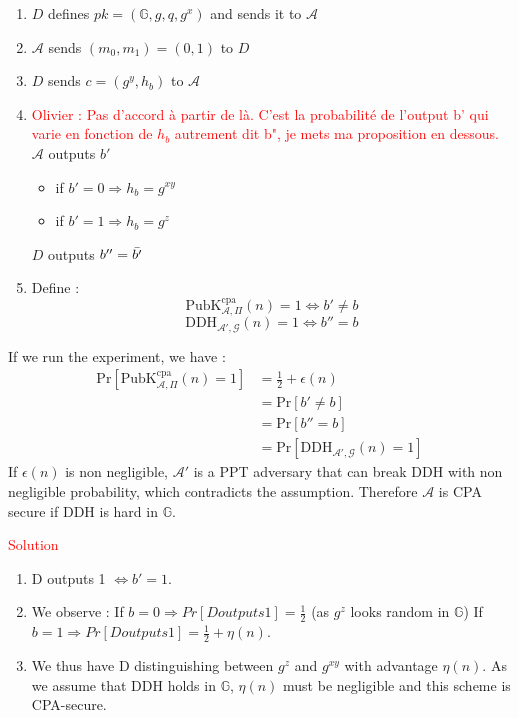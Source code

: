 \begin{solution}
\begin{enumerate}
\begin{enumerate}
        \item $D$ defines $pk = (\mathbb{G},g,q,g^x)$ and sends it to $\mathcal{A}$
        \item $\mathcal{A}$ sends $(m_0,m_1) = (0,1)$ to $D$
        \item $D$ sends $c=(g^y,h_b)$ to $\mathcal{A}$
        \item \textcolor{red}{Olivier : Pas d'accord à partir de là. C'est la probabilité de l'output b' qui varie en fonction de $h_b$ autrement dit b", je mets ma proposition en dessous.} $\mathcal{A}$ outputs $b'$ 
            \begin{itemize}
                \item if $b'=0\Rightarrow h_b=g^{xy}$
                \item if $b'=1\Rightarrow h_b=g^z$
            \end{itemize}
            $D$ outputs $b''=\Bar{b'}$
        \item Define : $$\text{PubK}^\text{cpa}_{\mathcal{A},\Pi}(n) = 1 \Leftrightarrow b'\neq b$$ $$\text{DDH}_{\mathcal{A}',\mathcal{G}}(n) = 1 \Leftrightarrow b''=b$$
    \end{enumerate}
    If we run the experiment, we have :
    \begin{align*}
        \text{Pr}[\text{PubK}^\text{cpa}_{\mathcal{A},\Pi}(n) = 1] &= \frac{1}{2}+\epsilon(n)\\
        &= \text{Pr}[b'\neq b]\\
        &= \text{Pr}[b''=b]\\
        &= \text{Pr}[\text{DDH}_{\mathcal{A}',\mathcal{G}}(n) = 1]
    \end{align*}
    If $\epsilon(n)$ is non negligible, $\mathcal{A}'$ is a PPT adversary that can break DDH with non negligible probability, which contradicts the assumption. Therefore $\mathcal{A}$ is CPA secure if DDH is hard in $\mathbb{G}$.
\end{enumerate}

\textcolor{red}{Solution} 

\begin{enumerate}
    \item D outputs 1 $\Leftrightarrow b'=1$.
    \item We observe : \newline
    If $b=0 \Rightarrow Pr[D outputs 1]=\frac{1}{2}$ (as $g^z$ looks random in $\mathbb{G}$) \newline
    If $b=1 \Rightarrow Pr[D outputs 1]=\frac{1}{2}+\eta(n)$.
    \item We thus have D distinguishing between $g^z$ and $g^{xy}$ with advantage $\eta(n)$. As we assume that DDH holds in $\mathbb{G}$, $\eta(n)$ must be negligible and this scheme is CPA-secure.
\end{enumerate}

\end{solution}

